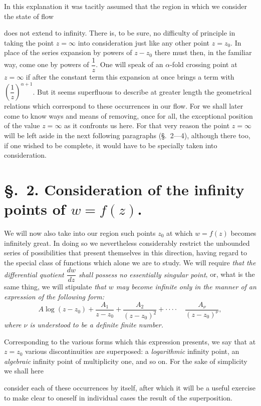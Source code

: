 \documentclass{article}
\begin{document}
In this explanation it was tacitly assumed that the region in which we consider the state of flow

does not extend to infinity. There is, to be sure, no difficulty of principle in taking the point $z = \infty$ into consideration just like any other point $z = z_{0}$. In place of the series expansion by powers of $z - z_{0}$ there must then, in the familiar way, come one by powers of $\dfrac{1}{z}$. One will speak of an $\alpha$-fold crossing point at $z = \infty$ if after the constant term this expansion at once brings a term with $\left(\dfrac{1}{z}\right)^{\alpha+1}$. But it seems superfluous to describe at greater length the geometrical relations which correspond to these occurrences in our flow. For we shall later come to know ways and means of removing, once for all, the exceptional position of the value $z = \infty$ as it confronts us here. For that very reason the point $z = \infty$ will be left aside in the next following paragraphs (§.~2---4), although there too, if one wished to be complete, it would have to be specially taken into consideration.

\section*{§.~2. Consideration of the infinity points of $w = f(z)$.}

We will now also take into our region such points $z_{0}$ at which $w = f(z)$ becomes infinitely great. In doing so we nevertheless considerably restrict the unbounded series of possibilities that present themselves in this direction, having regard to the special class of functions which alone we are to study. We will require \emph{that the differential quotient $\dfrac{dw}{dz}$ shall possess no essentially singular point}, or, what is the same thing, we will stipulate \emph{that $w$ may become infinite only in the manner of an expression of the following form:}
\[ A \log (z - z_{0}) + \frac{A_{1}}{z - z_{0}} + \frac{A_{2}}{(z - z_{0})^{2}} + \cdot\cdot\cdot\cdot \quad \frac{A_{\nu}}{(z - z_{0})^{\nu}}, \]
\emph{where $\nu$ is understood to be a definite finite number.}

Corresponding to the various forms which this expression presents, we say that at $z = z_{0}$ various discontinuities are superposed: a \emph{logarithmic} infinity point, an \emph{algebraic} infinity point of multiplicity one, and so on. For the sake of simplicity we shall here

consider each of these occurrences by itself, after which it will be a useful exercise to make clear to oneself in individual cases the result of the superposition.
\end{document}
